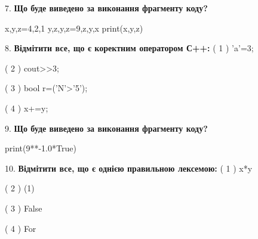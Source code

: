 \documentclass[11pt]{article}
\begin{document}
7. \textbf{Що буде виведено за виконання фрагменту коду?}

x,y,z=4,2,1
y,z,y,z=9,z,y,x
print(x,y,z)
\vspace{5mm}

8. %
\textbf{Відмітити все, що є коректним оператором С++:}
( 1 ) 'a'=3;

( 2 ) cout>>3;

( 3 ) bool r=('N'>'5');

( 4 ) x+=y;
\vspace{5mm}

9. \textbf{Що буде виведено за виконання фрагменту коду?}

print(9**-1.0*True)
\vspace{5mm}

10. %
\textbf{Відмітити все, що є однією правильною лексемою:}
( 1 ) x*y

( 2 ) (1)

( 3 ) False

( 4 ) For
\vspace{5mm}

\newpage
\end{document}
